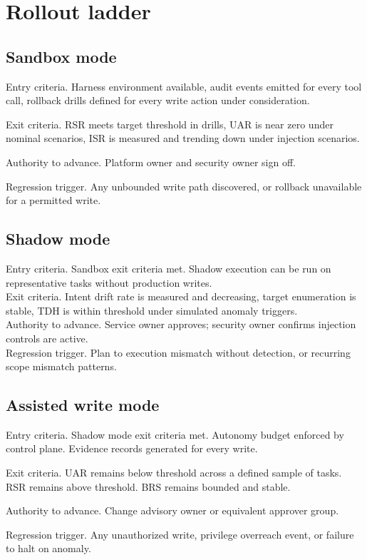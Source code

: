 \documentclass[11pt]{article}
\begin{document}
\section{Rollout ladder}

\subsection{Sandbox mode}
Entry criteria. Harness environment available, audit events emitted for every tool call, rollback drills defined for every write action under consideration.

Exit criteria. RSR meets target threshold in drills, UAR is near zero under nominal scenarios, ISR is measured and trending down under injection scenarios.

Authority to advance. Platform owner and security owner sign off.

Regression trigger. Any unbounded write path discovered, or rollback unavailable for a permitted write.

\subsection{Shadow mode}
Entry criteria. Sandbox exit criteria met. Shadow execution can be run on representative tasks without production writes.\\
Exit criteria. Intent drift rate is measured and decreasing, target enumeration is stable, TDH is within threshold under simulated anomaly triggers.\\
Authority to advance. Service owner approves; security owner confirms injection controls are active.\\
Regression trigger. Plan to execution mismatch without detection, or recurring scope mismatch patterns.

\subsection{Assisted write mode}
Entry criteria. Shadow mode exit criteria met. Autonomy budget enforced by control plane. Evidence records generated for every write.

Exit criteria. UAR remains below threshold across a defined sample of tasks. RSR remains above threshold. BRS remains bounded and stable.

Authority to advance. Change advisory owner or equivalent approver group.

Regression trigger. Any unauthorized write, privilege overreach event, or failure to halt on anomaly.
\end{document}
